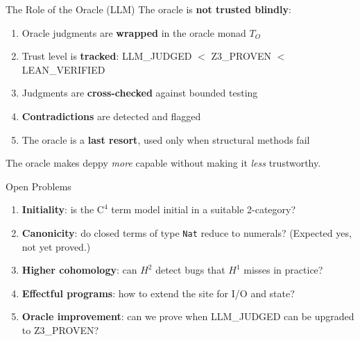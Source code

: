 \documentclass[aspectratio=169,11pt]{beamer}
\newcommand{\Cfour}{\mathrm{C}^4}
\begin{document}
\begin{frame}{The Role of the Oracle (LLM)}
The oracle is \textbf{not trusted blindly}:

\begin{enumerate}
\item Oracle judgments are \textbf{wrapped} in the oracle monad $T_O$
\item Trust level is \textbf{tracked}: LLM\_JUDGED $<$ Z3\_PROVEN $<$ LEAN\_VERIFIED
\item Judgments are \textbf{cross-checked} against bounded testing
\item \textbf{Contradictions} are detected and flagged
\item The oracle is a \textbf{last resort}, used only when structural methods fail
\end{enumerate}

\vspace{0.5em}
The oracle makes deppy \emph{more} capable without making it \emph{less} trustworthy.
\end{frame}

\begin{frame}{Open Problems}
\begin{enumerate}
\item \textbf{Initiality}: is the $\Cfour$ term model initial in a suitable 2-category?
\item \textbf{Canonicity}: do closed terms of type \texttt{Nat} reduce to numerals? (Expected yes, not yet proved.)
\item \textbf{Higher cohomology}: can $H^2$ detect bugs that $H^1$ misses in practice?
\item \textbf{Effectful programs}: how to extend the site for I/O and state?
\item \textbf{Oracle improvement}: can we prove when LLM\_JUDGED can be upgraded to Z3\_PROVEN?
\end{enumerate}
\end{frame}
\end{document}
